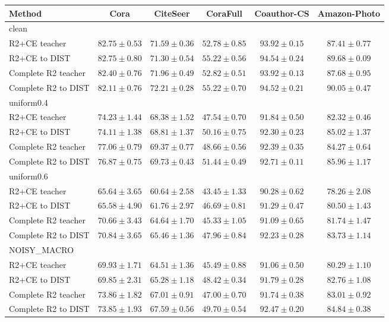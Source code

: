 \begin{tabular}{lccccc}
\hline
Method & Cora & CiteSeer & CoraFull & Coauthor-CS & Amazon-Photo \\
\hline
\multicolumn{6}{l}{clean} \\
R2+CE teacher & $82.75 \pm 0.53$ & $71.59 \pm 0.36$ & $52.78 \pm 0.85$ & $93.92 \pm 0.15$ & $87.41 \pm 0.77$ \\
R2+CE to DIST & $82.75 \pm 0.80$ & $71.30 \pm 0.54$ & $55.22 \pm 0.56$ & $94.54 \pm 0.24$ & $89.68 \pm 0.09$ \\
Complete R2 teacher & $82.40 \pm 0.76$ & $71.96 \pm 0.49$ & $52.82 \pm 0.51$ & $93.92 \pm 0.13$ & $87.68 \pm 0.95$ \\
Complete R2 to DIST & $82.11 \pm 0.76$ & $72.21 \pm 0.28$ & $55.22 \pm 0.70$ & $94.52 \pm 0.21$ & $90.05 \pm 0.47$ \\
\hline
\multicolumn{6}{l}{uniform0.4} \\
R2+CE teacher & $74.23 \pm 1.44$ & $68.38 \pm 1.52$ & $47.54 \pm 0.70$ & $91.84 \pm 0.50$ & $82.32 \pm 0.46$ \\
R2+CE to DIST & $74.11 \pm 1.38$ & $68.81 \pm 1.37$ & $50.16 \pm 0.75$ & $92.30 \pm 0.23$ & $85.02 \pm 1.37$ \\
Complete R2 teacher & $77.06 \pm 0.79$ & $69.37 \pm 0.77$ & $48.66 \pm 0.56$ & $92.39 \pm 0.35$ & $84.27 \pm 0.64$ \\
Complete R2 to DIST & $76.87 \pm 0.75$ & $69.73 \pm 0.43$ & $51.44 \pm 0.49$ & $92.71 \pm 0.11$ & $85.96 \pm 1.17$ \\
\hline
\multicolumn{6}{l}{uniform0.6} \\
R2+CE teacher & $65.64 \pm 3.65$ & $60.64 \pm 2.58$ & $43.45 \pm 1.33$ & $90.28 \pm 0.62$ & $78.26 \pm 2.08$ \\
R2+CE to DIST & $65.58 \pm 4.90$ & $61.76 \pm 2.97$ & $46.69 \pm 0.81$ & $91.29 \pm 0.47$ & $80.50 \pm 1.43$ \\
Complete R2 teacher & $70.66 \pm 3.43$ & $64.64 \pm 1.70$ & $45.33 \pm 1.05$ & $91.09 \pm 0.65$ & $81.74 \pm 1.47$ \\
Complete R2 to DIST & $70.84 \pm 3.65$ & $65.46 \pm 1.36$ & $47.96 \pm 0.84$ & $92.23 \pm 0.28$ & $83.73 \pm 1.14$ \\
\hline
\multicolumn{6}{l}{NOISY\_MACRO} \\
R2+CE teacher & $69.93 \pm 1.71$ & $64.51 \pm 1.36$ & $45.49 \pm 0.88$ & $91.06 \pm 0.50$ & $80.29 \pm 1.10$ \\
R2+CE to DIST & $69.85 \pm 2.31$ & $65.28 \pm 1.18$ & $48.42 \pm 0.34$ & $91.79 \pm 0.28$ & $82.76 \pm 1.08$ \\
Complete R2 teacher & $73.86 \pm 1.82$ & $67.01 \pm 0.91$ & $47.00 \pm 0.70$ & $91.74 \pm 0.38$ & $83.01 \pm 0.92$ \\
Complete R2 to DIST & $73.85 \pm 1.93$ & $67.59 \pm 0.56$ & $49.70 \pm 0.54$ & $92.47 \pm 0.20$ & $84.84 \pm 0.38$ \\
\hline
\end{tabular}
